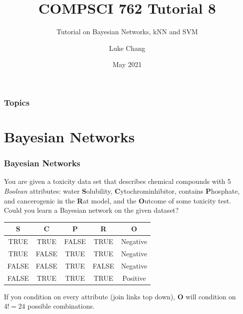 \documentclass[aspectratio=169, 10pt]{beamer}
\title{COMPSCI 762 Tutorial 8}
\subtitle{Tutorial on Bayesian Networks, kNN and SVM}
\author{Luke Chang}
\institute{The University of Auckland}
\date{May 2021}
\begin{document}
\frame{\titlepage}

\begin{frame}
    \frametitle{Topics}

    \tableofcontents
        
\end{frame}

\section{Bayesian Networks}
\begin{frame}[t]
    \frametitle{Bayesian Networks}

    \begin{example}
        You are given a toxicity data set that describes chemical compounds with 5 \textit{Boolean}
        attributes: water \textbf{S}olubility, \textbf{C}ytochrominhibitor, contains \textbf{P}hosphate, and
        cancerogenic in the \textbf{R}at model, and the \textbf{O}utcome of some toxicity test.\\
        Could you learn a Bayesian network on the given dataset?
    \end{example}
    
    \begin{table}[]
        \small
        \begin{tabular}{cccc|c}
        \textbf{S} & \textbf{C} & \textbf{P} & \textbf{R} & \textbf{O} \\ \hline
        TRUE       & TRUE       & FALSE      & TRUE       & Negative   \\
        TRUE       & FALSE      & TRUE       & TRUE       & Negative   \\
        FALSE      & FALSE      & TRUE       & FALSE      & Negative   \\
        FALSE      & TRUE       & TRUE       & TRUE       & Positive  
        \end{tabular}
    \end{table}

    \vspace{2em}
    If you condition on every attribute (join links top down), \textbf{O} will condition on $4!=24$ possible combinations.
\end{frame}
\end{document}
